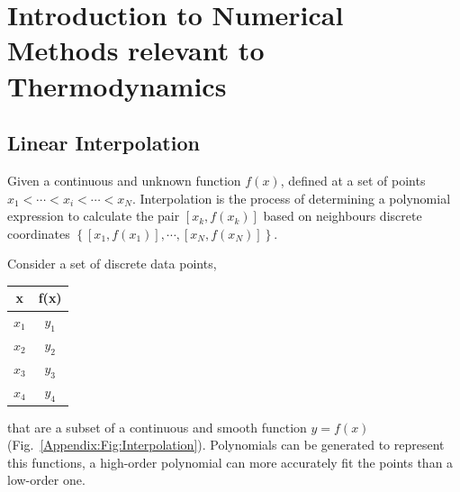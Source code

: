 
\chapter{Introduction to Numerical Methods relevant to Thermodynamics}\label{Appendix_NumMethods}

\section{Linear Interpolation}\label{LinearInterpolation}

Given a continuous and unknown function $f(x)$, defined at a set of points  $x_{1} < \cdots < x_{i} < \cdots < x_{N}$. Interpolation is the process of determining a polynomial expression to calculate the pair $\left[x_{k}, f\left(x_{k}\right)\right]$ based on neighbours discrete coordinates $\left\{\left[x_{1},f\left(x_{1}\right)\right], \cdots, \left[x_{N},f\left(x_{N}\right)\right]\right\}$. 

Consider a set of discrete data points,

  \begin{tabular}{c | c }
      {\bf x}   & {\bf f(x)} \\
       \hline
         $x_{1}$ &  $y_{1}$ \\
         $x_{2}$ &  $y_{2}$ \\
         $x_{3}$ &  $y_{3}$ \\
         $x_{4}$ &  $y_{4}$ \\
  \end{tabular}
that are a subset of a continuous and smooth function $y=f(x)$ (Fig.~\ref{Appendix:Fig:Interpolation}). Polynomials can be generated to represent this functions, a high-order polynomial can more accurately fit the points than a low-order one.   

